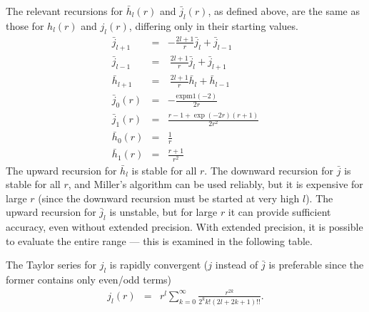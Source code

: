 \documentclass[12pt]{article}
\begin{document}
The relevant recursions for $\bar{h}_l(r)$ and $\bar{j}_l(r)$, as defined above, are the same as those for $h_l(r)$ and $j_l(r)$, differing only in their starting values.
\begin{eqnarray}
  \bar{j}_{l+1} & = & -\frac{2l+1}{r} \bar{j}_l + \bar{j}_{l-1} \\
  \bar{j}_{l-1} & = & \!\ \frac{2l+1}{r} \bar{j}_l + \bar{j}_{l+1} \\
  \bar{h}_{l+1} & = & \!\ \frac{2l+1}{r} \bar{h}_l + \bar{h}_{l-1} \\
  \bar{j}_0(r) & = & -\frac{\mathrm{expm1}(-2)}{2r} \\
  \bar{j}_1(r) & = & \frac{r-1+\exp(-2r)(r+1)}{2 r^2} \\
  \bar{h}_0(r) & = & \frac{1}{r} \\
  \bar{h}_1(r) & = & \frac{r+1}{r^2}
\end{eqnarray}
The upward recursion for $\bar{h}_l$ is stable for all $r$.  The downward recursion for $\bar{j}$ is stable for all $r$, and Miller's algorithm can be used reliably, but it is expensive for large $r$ (since the downward recursion must be started at very high $l$).  The upward recursion for $\bar{j}_l$ is unstable, but for large $r$ it can provide sufficient accuracy, even without extended precision.  With extended precision, it is possible to evaluate the entire range --- this is examined in the following table.

The Taylor series for $j_l$ is rapidly convergent ($j$ instead of $\bar{j}$ is preferable since the former contains only even/odd terms)
\begin{eqnarray}
 j_l(r) & = & r^l \sum_{k=0}^\infty \frac{r^{2k}}{2^k k! (2l+2k+1)!!} .
\end{eqnarray}
\end{document}
